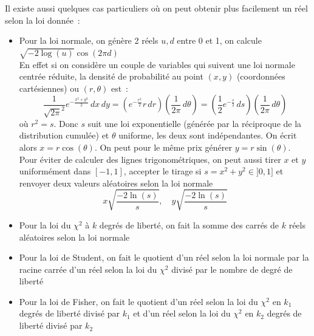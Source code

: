 \documentclass[a4paper,11pt]{book}
\begin{document}
\begin{giacjshere}
Il existe aussi quelques cas particuliers o\`u
on peut obtenir plus facilement un r\'eel selon la loi
donn\'ee~:
\begin{itemize}
\item Pour la loi normale, on g\'en\`ere 2 r\'eels $u,d$
entre 0 et 1, on calcule \\
$\sqrt{-2 \log(u)} \cos(2\pi d)$\\
En effet si on considère un couple de variables qui
suivent une loi normale centrée réduite, la densité de probabilité
au point $(x,y)$ (coordonnées cartésiennes) ou $(r,\theta)$ est~:
$$ \frac{1}{\sqrt{2\pi}^2} e^{-\frac{x^2+y^2}{2}} \, dx \, dy
=  \left( e^{-\frac{r^2}{2}} r  \, dr \right)
\left( \frac{1}{2\pi} \, d\theta \right)
= \left( \frac{1}{2} e^{-\frac s2} \, ds \right)
\left( \frac{1}{2\pi} \, d\theta \right)$$
où $r^2=s$. Donc $s$ suit une loi exponentielle (générée
par la réciproque de la distribution cumulée) et $\theta$
uniforme, les deux sont indépendantes. On écrit 
alors $x=r\cos(\theta)$. On peut pour le même prix
générer $y=r\sin(\theta)$. \\
Pour éviter de calculer
des lignes trigonométriques, on peut aussi tirer
$x$ et $y$ uniformément dans $[-1,1]$, accepter le tirage
si $s=x^2+y^2 \in ]0,1]$ et renvoyer deux valeurs
aléatoires selon la loi normale
$$ x \sqrt{\frac{-2\ln(s)}{s}}, \quad y \sqrt{\frac{-2\ln(s)}{s}} $$
\item Pour la loi du $\chi^2$ \`a $k$ degr\'es de libert\'e, 
on fait la somme
des carr\'es de $k$ r\'eels al\'eatoires selon la loi normale
\item Pour la loi de Student, on fait le quotient d'un réel
selon la loi normale par la racine carrée
d'un réel selon la loi du $\chi^2$ divisé par le nombre
de degré de liberté
\item Pour la loi de Fisher, on fait le quotient d'un réel
selon la loi du $\chi^2$ en $k_1$ degrés de liberté divisé par
$k_1$ et d'un réel
selon la loi du $\chi^2$ en $k_2$ degrés de liberté divisé par
$k_2$
\end{itemize}


\end{giacjshere}
\end{document}
